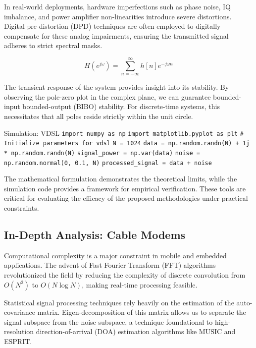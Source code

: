 In real-world deployments, hardware imperfections such as phase noise, IQ imbalance, and power amplifier non-linearities introduce severe distortions. Digital pre-distortion (DPD) techniques are often employed to digitally compensate for these analog impairments, ensuring the transmitted signal adheres to strict spectral masks.

\begin{equation}
    H(e^{j\omega}) = \sum_{n=-\infty}^{\infty} h[n] e^{-j\omega n}
\end{equation}

The transient response of the system provides insight into its stability. By observing the pole-zero plot in the complex plane, we can guarantee bounded-input bounded-output (BIBO) stability. For discrete-time systems, this necessitates that all poles reside strictly within the unit circle.

\begin{pythonbox}{Simulation: VDSL}
\texttt{import numpy as np}
\texttt{import matplotlib.pyplot as plt}
\texttt{}
\texttt{\# Initialize parameters for vdsl}
\texttt{N = 1024}
\texttt{data = np.random.randn(N) + 1j * np.random.randn(N)}
\texttt{signal\_power = np.var(data)}
\texttt{noise = np.random.normal(0, 0.1, N)}
\texttt{processed\_signal = data + noise}
\end{pythonbox}

\vspace{0.5cm}
The mathematical formulation demonstrates the theoretical limits, while the simulation code provides a framework for empirical verification. These tools are critical for evaluating the efficacy of the proposed methodologies under practical constraints.


\subsection{In-Depth Analysis: Cable Modems}
Computational complexity is a major constraint in mobile and embedded applications. The advent of Fast Fourier Transform (FFT) algorithms revolutionized the field by reducing the complexity of discrete convolution from $O(N^2)$ to $O(N \log N)$, making real-time processing feasible.

Statistical signal processing techniques rely heavily on the estimation of the auto-covariance matrix. Eigen-decomposition of this matrix allows us to separate the signal subspace from the noise subspace, a technique foundational to high-resolution direction-of-arrival (DOA) estimation algorithms like MUSIC and ESPRIT.

